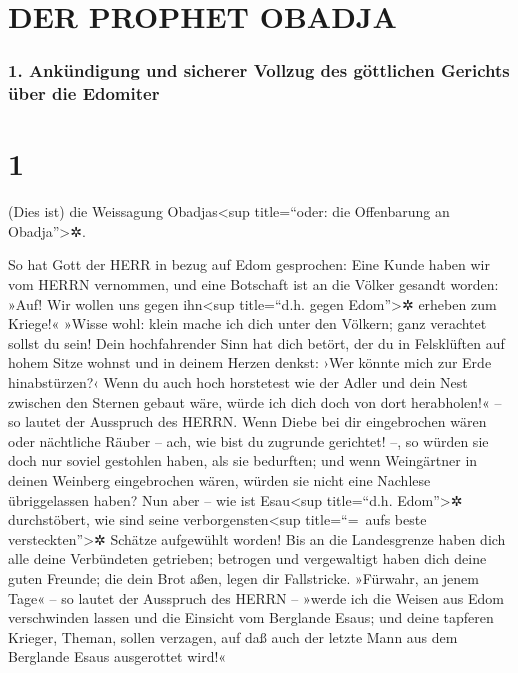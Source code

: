 \hypertarget{der-prophet-obadja}{%
\section{DER PROPHET OBADJA}\label{der-prophet-obadja}}

\hypertarget{ankuxfcndigung-und-sicherer-vollzug-des-guxf6ttlichen-gerichts-uxfcber-die-edomiter}{%
\subsubsection{1. Ankündigung und sicherer Vollzug des göttlichen
Gerichts über die
Edomiter}\label{ankuxfcndigung-und-sicherer-vollzug-des-guxf6ttlichen-gerichts-uxfcber-die-edomiter}}

\hypertarget{section}{%
\section{1}\label{section}}

(Dies ist) die Weissagung Obadjas\textless sup
title=``oder: die Offenbarung an Obadja''\textgreater✲.

So hat Gott der HERR in bezug auf Edom gesprochen: Eine Kunde haben wir
vom HERRN vernommen, und eine Botschaft ist an die Völker gesandt
worden: »Auf! Wir wollen uns gegen ihn\textless sup title=``d.h. gegen
Edom''\textgreater✲ erheben zum Kriege!« »Wisse wohl:
klein mache ich dich unter den Völkern; ganz verachtet sollst du sein!
Dein hochfahrender Sinn hat dich betört, der du in
Felsklüften auf hohem Sitze wohnst und in deinem Herzen denkst: ›Wer
könnte mich zur Erde hinabstürzen?‹ Wenn du auch hoch
horstetest wie der Adler und dein Nest zwischen den Sternen gebaut wäre,
würde ich dich doch von dort herabholen!« -- so lautet der Ausspruch des
HERRN. Wenn Diebe bei dir eingebrochen wären oder
nächtliche Räuber -- ach, wie bist du zugrunde gerichtet! --, so würden
sie doch nur soviel gestohlen haben, als sie bedurften; und wenn
Weingärtner in deinen Weinberg eingebrochen wären, würden sie nicht eine
Nachlese übriggelassen haben? Nun aber -- wie ist
Esau\textless sup title=``d.h. Edom''\textgreater✲ durchstöbert, wie
sind seine verborgensten\textless sup title=``=~aufs beste
versteckten''\textgreater✲ Schätze aufgewühlt worden! Bis
an die Landesgrenze haben dich alle deine Verbündeten getrieben;
betrogen und vergewaltigt haben dich deine guten Freunde; die dein Brot
aßen, legen dir Fallstricke. »Fürwahr, an jenem Tage« --
so lautet der Ausspruch des HERRN -- »werde ich die Weisen aus Edom
verschwinden lassen und die Einsicht vom Berglande Esaus;
und deine tapferen Krieger, Theman, sollen verzagen, auf
daß auch der letzte Mann aus dem Berglande Esaus ausgerottet wird!«

